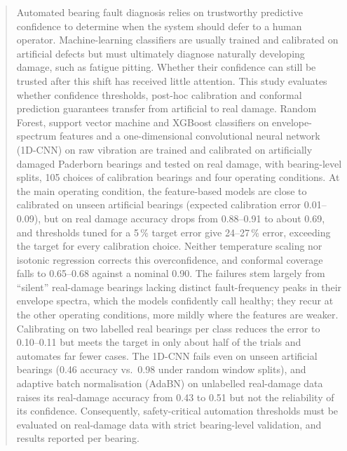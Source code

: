 \begin{abstract}
Automated bearing fault diagnosis relies on trustworthy predictive confidence to determine when the system should
defer to a human operator. Machine-learning classifiers are usually trained and calibrated on artificial defects but
must ultimately diagnose naturally developing damage, such as fatigue pitting. Whether their confidence can still be
trusted after this shift has received little attention. This study evaluates whether confidence thresholds, post-hoc
calibration and conformal prediction guarantees transfer from artificial to real damage. Random Forest, support vector
machine and XGBoost classifiers on envelope-spectrum features and a one-dimensional convolutional neural network
(1D-CNN) on raw vibration are trained and calibrated on artificially damaged Paderborn bearings and tested on real
damage, with bearing-level splits, 105 choices of calibration bearings and four operating conditions. At the main
operating condition, the feature-based models are close to calibrated on unseen artificial bearings (expected
calibration error 0.01--0.09), but on real damage accuracy drops from 0.88--0.91 to about 0.69, and thresholds tuned
for a 5\,\% target error give 24--27\,\% error, exceeding the target for every calibration choice. Neither temperature
scaling nor isotonic regression corrects this overconfidence, and conformal coverage falls to 0.65--0.68 against a
nominal 0.90. The failures stem largely from ``silent'' real-damage bearings lacking distinct fault-frequency peaks in
their envelope spectra, which the models confidently call healthy; they recur at the other operating conditions, more
mildly where the features are weaker. Calibrating on two labelled real bearings per class reduces the error to
0.10--0.11 but meets the target in only about half of the trials and automates far fewer cases. The 1D-CNN fails even
on unseen artificial bearings (0.46 accuracy vs.\ 0.98 under random window splits), and adaptive batch normalisation
(AdaBN) on unlabelled real-damage data raises its real-damage accuracy from 0.43 to 0.51 but not the reliability of
its confidence. Consequently, safety-critical automation thresholds must be evaluated on real-damage data with strict
bearing-level validation, and results reported per bearing.
\end{abstract}
